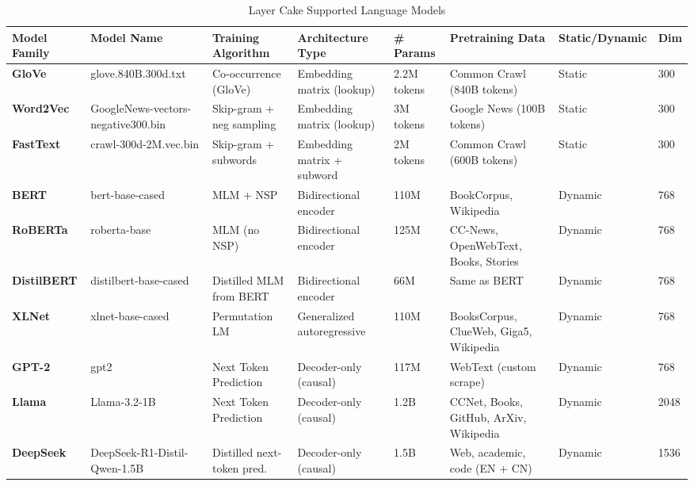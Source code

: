 \documentclass[final]{clv2025}
\begin{document}
\begin{table}[h!]
\centering
\scriptsize
\caption{Layer Cake Supported Language Models}
\renewcommand{\arraystretch}{1.2}
\begin{tabular}{@{}p{1.4cm} p{2cm} p{1.8cm} p{1.7cm} p{1.1cm} p{2.2cm} p{1cm} p{0.8cm}@{}}
\toprule
\textbf{Model Family} & \textbf{Model Name} & \textbf{Training Algorithm} & \textbf{Architecture Type} & \textbf{\# Params} & \textbf{Pretraining Data} & \textbf{Static/\newline Dynamic} & \textbf{Dim} \\
\midrule
\textbf{GloVe} & glove.840B.300d.txt & Co-occurrence (GloVe) & Embedding matrix (lookup) & 2.2M tokens & Common Crawl (840B tokens) & Static & 300 \\
\textbf{Word2Vec} & GoogleNews-vectors-negative300.bin & Skip-gram + neg sampling & Embedding matrix (lookup) & 3M tokens & Google News (100B tokens) & Static & 300 \\
\textbf{FastText} & crawl-300d-2M.vec.bin & Skip-gram + subwords & Embedding matrix + subword & 2M tokens & Common Crawl (600B tokens) & Static & 300 \\
\midrule
\textbf{BERT} & bert-base-cased & MLM + NSP & Bidirectional encoder & 110M & BookCorpus, Wikipedia & Dynamic & 768 \\
\textbf{RoBERTa} & roberta-base & MLM (no NSP) & Bidirectional encoder & 125M & CC-News, OpenWebText, Books, Stories & Dynamic & 768 \\
\textbf{DistilBERT} & distilbert-base-cased & Distilled MLM from BERT & Bidirectional encoder & 66M & Same as BERT & Dynamic & 768 \\
\textbf{XLNet} & xlnet-base-cased & Permutation LM & Generalized autoregressive & 110M & BooksCorpus, ClueWeb, Giga5, Wikipedia & Dynamic & 768 \\
\textbf{GPT-2} & gpt2 & Next Token Prediction & Decoder-only (causal) & 117M & WebText (custom scrape) & Dynamic & 768 \\
\textbf{Llama} & Llama-3.2-1B & Next Token Prediction & Decoder-only (causal) & 1.2B & CCNet, Books, GitHub, ArXiv, Wikipedia & Dynamic & 2048 \\
\textbf{DeepSeek} & DeepSeek-R1-Distil-Qwen-1.5B & Distilled next-token pred. & Decoder-only (causal) & 1.5B & Web, academic, code (EN + CN) & Dynamic & 1536 \\
\bottomrule
\end{tabular}
\end{table}
\end{document}
